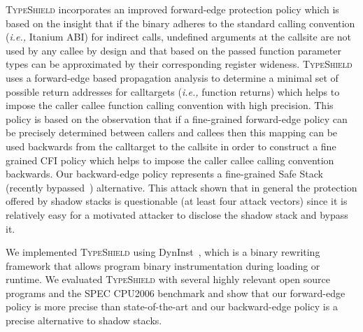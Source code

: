 \textsc{TypeShield} incorporates an improved forward-edge protection policy which is
based on the insight that if the binary adheres to the standard calling convention (\textit{i.e.,} Itanium ABI)
for indirect calls, undefined arguments at the callsite are not used by any callee by design and that based
on the passed function parameter types can be approximated by their corresponding register wideness.
\textsc{TypeShield} uses a forward-edge based propagation analysis to determine a minimal
set of possible return addresses for calltargets (\textit{i.e.,} function returns) which helps to impose the caller callee 
function calling convention with high precision. This policy is based on the observation that if a fine-grained 
forward-edge policy can be precisely determined between callers and callees then this mapping can be used backwards 
from the calltarget to the callsite in order to construct a fine grained CFI policy which helps to impose the caller callee calling convention backwards.
Our backward-edge policy represents a fine-grained Safe Stack~\cite{volodymyr:cpi} (recently bypassed~\cite{safestack:bypassing}) alternative.
This attack shown that in general the protection offered by shadow stacks is questionable (at least four attack vectors) since it is relatively 
easy for a motivated attacker to disclose the shadow stack and bypass it.

We implemented \textsc{TypeShield} using DynInst~\cite{bernat:dyninst}, which is
a binary rewriting framework that allows program binary instrumentation during loading or runtime.
We evaluated \textsc{TypeShield} with several highly relevant open source programs and the SPEC CPU2006 benchmark
and show that our forward-edge policy is more precise than state-of-the-art and our backward-edge policy is a precise 
alternative to shadow stacks. 


